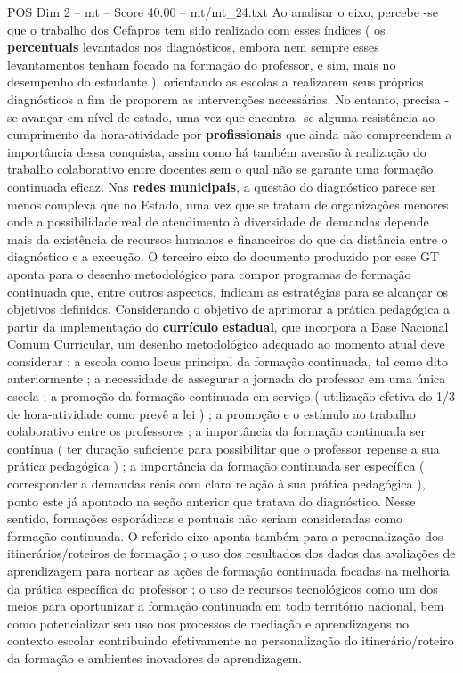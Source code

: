 \begin{textsample}{POS Dim 2 – mt – Score 40.00 – mt/mt\_24.txt}
Ao analisar o eixo, percebe -se que o trabalho dos Cefapros tem sido realizado com esses índices ( os \textbf{percentuais} levantados nos diagnósticos, embora nem sempre esses levantamentos tenham focado na formação do professor, e sim, mais no desempenho do estudante ), orientando as escolas a realizarem seus próprios diagnósticos a fim de proporem as intervenções necessárias.
No entanto, precisa -se avançar em nível de estado, uma vez que encontra -se alguma resistência ao cumprimento da hora-atividade por \textbf{profissionais} que ainda não compreendem a importância dessa conquista, assim como há também aversão à realização do trabalho colaborativo entre docentes sem o qual não se garante uma formação continuada eficaz.
Nas \textbf{redes} \textbf{municipais}, a questão do diagnóstico parece ser menos complexa que no Estado, uma vez que se tratam de organizações menores onde a possibilidade real de atendimento à diversidade de demandas depende mais da existência de recursos humanos e financeiros do que da distância entre o diagnóstico e a execução.
O terceiro eixo do documento produzido por esse GT aponta para o desenho metodológico para compor programas de formação continuada que, entre outros aspectos, indicam as estratégias para se alcançar os objetivos definidos.
Considerando o objetivo de aprimorar a prática pedagógica a partir da implementação do \textbf{currículo} \textbf{estadual}, que incorpora a Base Nacional Comum Curricular, um desenho metodológico adequado ao momento atual deve considerar : a escola como locus principal da formação continuada, tal como dito anteriormente ; a necessidade de assegurar a jornada do professor em uma única escola ; a promoção da formação continuada em serviço ( utilização efetiva do 1/3 de hora-atividade como prevê a lei ) ; a promoção e o estímulo ao trabalho colaborativo entre os professores ; a importância da formação continuada ser contínua ( ter duração suficiente para possibilitar que o professor repense a sua prática pedagógica ) ; a importância da formação continuada ser específica ( corresponder a demandas reais com clara relação à sua prática pedagógica ), ponto este já apontado na seção anterior que tratava do diagnóstico.
Nesse sentido, formações esporádicas e pontuais não seriam consideradas como formação continuada.
O referido eixo aponta também para a personalização dos itinerários/roteiros de formação ; o uso dos resultados dos dados das avaliações de aprendizagem para nortear as ações de formação continuada focadas na melhoria da prática específica do professor ; o uso de recursos tecnológicos como um dos meios para oportunizar a formação continuada em todo território nacional, bem como potencializar seu uso nos processos de mediação e aprendizagens no contexto escolar contribuindo efetivamente na personalização do itinerário/roteiro da formação e ambientes inovadores de aprendizagem.

\end{textsample}
